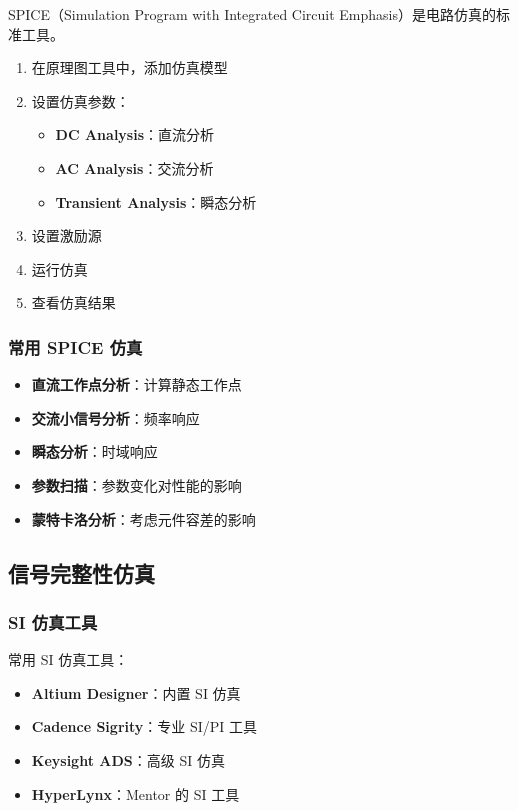 SPICE（Simulation Program with Integrated Circuit Emphasis）是电路仿真的标准工具。


\begin{enumerate}
  \item 在原理图工具中，添加仿真模型
  \item 设置仿真参数：
    \begin{itemize}
      \item \textbf{DC Analysis}：直流分析
      \item \textbf{AC Analysis}：交流分析
      \item \textbf{Transient Analysis}：瞬态分析
    \end{itemize}
  \item 设置激励源
  \item 运行仿真
  \item 查看仿真结果
\end{enumerate}

\subsubsection{常用 SPICE 仿真}

\begin{itemize}
  \item \textbf{直流工作点分析}：计算静态工作点
  \item \textbf{交流小信号分析}：频率响应
  \item \textbf{瞬态分析}：时域响应
  \item \textbf{参数扫描}：参数变化对性能的影响
  \item \textbf{蒙特卡洛分析}：考虑元件容差的影响
\end{itemize}

\subsection{信号完整性仿真}

\subsubsection{SI 仿真工具}

常用 SI 仿真工具：

\begin{itemize}
  \item \textbf{Altium Designer}：内置 SI 仿真
  \item \textbf{Cadence Sigrity}：专业 SI/PI 工具
  \item \textbf{Keysight ADS}：高级 SI 仿真
  \item \textbf{HyperLynx}：Mentor 的 SI 工具
\end{itemize}

